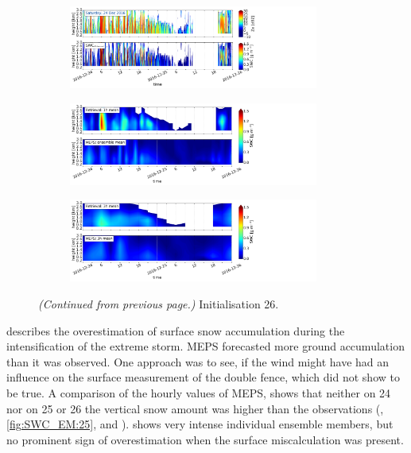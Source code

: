 \begin{figure}[ht!]\ContinuedFloat
	\centering
	\begin{subfigure}[t]{\textwidth}
		\centering
		\includegraphics[trim={0.cm 2.2cm 19.cm 0.5cm},clip,width=0.9\textwidth]{./fig_obs_ret/20161224}
		\caption{}\label{fig:SWC:ret_24}
	\end{subfigure}
	\begin{subfigure}[t]{\textwidth}
		\centering
		\includegraphics[trim={0.cm 2.2cm 19.cm 0.5cm},clip,width=0.9\textwidth]{./fig_vert_SWC_EM/20161224}
		\caption{}\label{fig:SWC_EM:24}
	\end{subfigure}
	\begin{subfigure}[t]{\textwidth}
		\centering
		\includegraphics[trim={0.cm 0.8cm 19.cm 0.5cm},clip,width=0.9\textwidth]{./fig_vert_SWC_3h/20161224}
		\caption{}\label{fig:SWC3h:24}
	\end{subfigure}
	\caption{\textit{(Continued from previous page.)} Initialisation \SI{26}{\dec}.}
\end{figure}
\noindent
{} describes the overestimation of surface snow accumulation during the intensification of the extreme storm. MEPS forecasted more ground accumulation than it was observed. One approach was to see, if the wind might have had an influence on the surface measurement of the double fence, which did not show to be true. A comparison of the hourly values of MEPS, shows that neither on \SI{24}{\dec} nor on \SI{25}{\dec} or \SI{26}{\dec} the vertical snow amount was higher than the observations (, \ref{fig:SWC_EM:25}, and ).  shows very intense individual ensemble members, but no prominent sign of overestimation when the surface miscalculation was present. 
